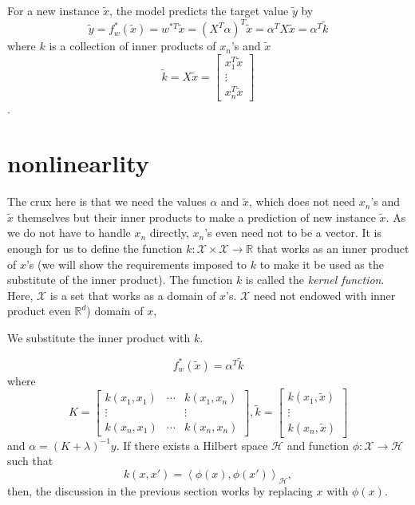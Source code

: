\documentclass{amsart}
\theoremstyle{definition}
\theoremstyle{remark}
\numberwithin{equation}{section}
\begin{document}
For a new instance $\tilde{x}$, the model predicts the target value $\tilde{y}$ by
\begin{equation}
\tilde{y} = f_w^{\ast}(\tilde{x}) = w^{\ast T} \tilde{x}
                      = (X^T \alpha)^T \tilde{x}
                      = \alpha^T X \tilde{x}
                      = \alpha^T \tilde{k}
\end{equation}
where $k$ is a collection of inner products of $x_n$'s and $\tilde{x}$
\[
\tilde{k} = X\tilde{x} =
\begin{bmatrix}
x_1^T \tilde{x}\\
\vdots \\
x_n^T \tilde{x}
\end{bmatrix}
\].

\section{nonlinearlity}

The crux here is that we need the values $\alpha$ and $\tilde{x}$,
which does not need $x_n$'s and $\tilde{x}$ themselves but their inner products
to make a prediction of new instance $\tilde{x}$.
As we do not have to handle $x_n$ directly, $x_n$'s even need not to be a vector.
It is enough for us to define the function $k: \mathcal{X} \times \mathcal{X}\to \mathbb{R}$
that works as an inner product of $x$'s
(we will show the requirements imposed to $k$ to make it be used as the substitute of the inner product).
The function $k$ is called the \textit{kernel function}.
Here, $\mathcal{X}$ is a set that works as a domain of $x$'s.
$\mathcal{X}$ need not endowed with inner product even $\mathbb{R}^d$) domain of $x$,

We substitute the inner product with $k$.

\begin{equation}
f_w^{\ast}(\tilde{x}) = \alpha^T \tilde{k}
\end{equation}
where
\begin{equation}
K =
\begin{bmatrix}
k(x_1, x_1) & \cdots & k(x_1, x_n)\\
\vdots & & \vdots \\
k(x_n, x_1) & \cdots & k(x_n, x_n)
\end{bmatrix}, \tilde{k} =
\begin{bmatrix}
k(x_1, \tilde{x})\\
\vdots\\
k(x_n, \tilde{x})
\end{bmatrix}
\end{equation}
and $\alpha = (K + \lambda)^{-1}y$.
If there exists a Hilbert space $\mathcal{H}$ and function $\phi: \mathcal{X}\to \mathcal{H}$ such that
\begin{equation}
k(x, x') = \left< \phi(x), \phi(x') \right>_\mathcal{H},
\end{equation}
then, the discussion in the previous section works by replacing $x$ with $\phi(x)$.
\end{document}
